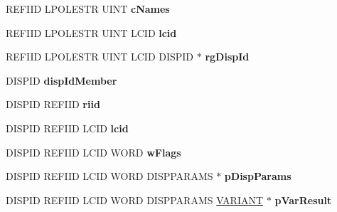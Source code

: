 \begin{DoxyCompactItemize}
\mbox{\label{struct_i_ms_tsc_advanced_settings_vtbl_a29dcbf742253078d140d126a397a3e0f}} 
R\+E\+F\+I\+ID L\+P\+O\+L\+E\+S\+TR U\+I\+NT {\bfseries c\+Names}
\item 
\mbox{\label{struct_i_ms_tsc_advanced_settings_vtbl_a942cfb6c7c8c5a632596c6069643ab6c}} 
R\+E\+F\+I\+ID L\+P\+O\+L\+E\+S\+TR U\+I\+NT L\+C\+ID {\bfseries lcid}
\item 
\mbox{\label{struct_i_ms_tsc_advanced_settings_vtbl_ae0de9bfa3d28f764fc03c07979e097e3}} 
R\+E\+F\+I\+ID L\+P\+O\+L\+E\+S\+TR U\+I\+NT L\+C\+ID D\+I\+S\+P\+ID $\ast$ {\bfseries rg\+Disp\+Id}
\item 
\mbox{\label{struct_i_ms_tsc_advanced_settings_vtbl_a59295ff91e70b7711fe580d06ef90939}} 
D\+I\+S\+P\+ID {\bfseries disp\+Id\+Member}
\item 
\mbox{\label{struct_i_ms_tsc_advanced_settings_vtbl_a6a44d8b3f182ac12e2243db454fcfcc7}} 
D\+I\+S\+P\+ID R\+E\+F\+I\+ID {\bfseries riid}
\item 
\mbox{\label{struct_i_ms_tsc_advanced_settings_vtbl_aaf2e246fee0025ebb66817cd95f72a3b}} 
D\+I\+S\+P\+ID R\+E\+F\+I\+ID L\+C\+ID {\bfseries lcid}
\item 
\mbox{\label{struct_i_ms_tsc_advanced_settings_vtbl_adcdb923b7566f62d079cbb4365e0f805}} 
D\+I\+S\+P\+ID R\+E\+F\+I\+ID L\+C\+ID W\+O\+RD {\bfseries w\+Flags}
\item 
\mbox{\label{struct_i_ms_tsc_advanced_settings_vtbl_a5c1f210626f90cf6e29e15d0099db30c}} 
D\+I\+S\+P\+ID R\+E\+F\+I\+ID L\+C\+ID W\+O\+RD D\+I\+S\+P\+P\+A\+R\+A\+MS $\ast$ {\bfseries p\+Disp\+Params}
\item 
\mbox{\label{struct_i_ms_tsc_advanced_settings_vtbl_ae5b95b24108e7c28c24623a166365fba}} 
D\+I\+S\+P\+ID R\+E\+F\+I\+ID L\+C\+ID W\+O\+RD D\+I\+S\+P\+P\+A\+R\+A\+MS \hyperlink{structtag_v_a_r_i_a_n_t}{V\+A\+R\+I\+A\+NT} $\ast$ {\bfseries p\+Var\+Result}

\end{DoxyCompactItemize}
